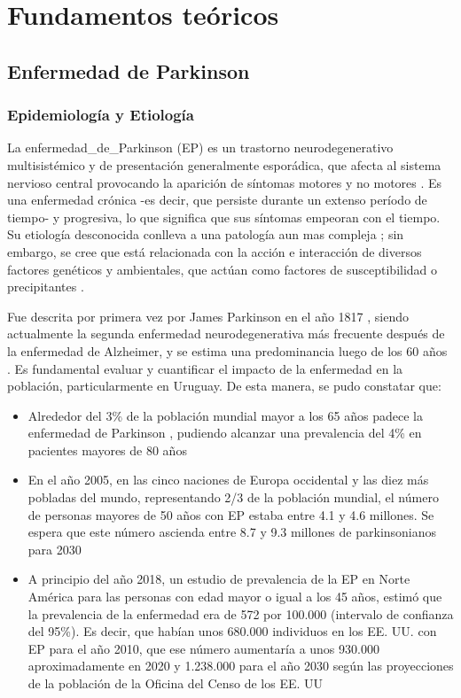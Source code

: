 \chapter{Fundamentos teóricos}\label{chap:fundamentos}

\section{Enfermedad de Parkinson}

\subsection{Epidemiología y Etiología}
La \gls{enfermedad_de_Parkinson} (EP) es un trastorno neurodegenerativo multisistémico y de presentación generalmente esporádica, que afecta al sistema nervioso central provocando la aparición de síntomas motores y no motores \cite{E2004}. Es una enfermedad crónica -es decir, que persiste durante un extenso período de tiempo- y progresiva, lo que significa que sus síntomas empeoran con el tiempo. Su etiología desconocida conlleva a una patología aun mas compleja \cite{3249850720080101}; sin embargo, se cree que está relacionada con la acción e interacción de diversos factores genéticos y ambientales, que actúan como factores de susceptibilidad o precipitantes \cite{CAMPDELACREU2014541}.

Fue descrita por primera vez por James Parkinson en el año 1817 \cite{JamesParkinson2002}, siendo actualmente la segunda enfermedad neurodegenerativa más frecuente después de la enfermedad de Alzheimer, y se estima una predominancia luego de los 60 años \cite{GOMEZGONZALEZ2019396,CHAVEZ-LEON2013}. Es fundamental evaluar y cuantificar el impacto de la enfermedad en la población, particularmente en Uruguay. De esta manera, se pudo constatar que:

\begin{itemize}
    \item Alrededor del 3\% de la población mundial mayor a los 65 años padece la enfermedad de Parkinson \cite{Patel2009}, pudiendo alcanzar una prevalencia del 4\% en pacientes mayores de 80 años \cite{DeLauBreteler}
    \item En el año 2005, en las cinco naciones de Europa occidental y las diez más pobladas del mundo, representando 2/3 de la población mundial, el número de personas mayores de 50 años con EP estaba entre 4.1 y 4.6 millones. Se espera que este número ascienda entre 8.7  y 9.3 millones de parkinsonianos para 2030 \cite{Dorsey2007ProjectedNO}
    \item A principio del año 2018, un estudio de prevalencia de la EP en Norte América para las personas con edad mayor o igual a los 45 años, estimó que la prevalencia de la enfermedad era de 572 por 100.000 (intervalo de confianza del 95\%). Es decir, que habían unos 680.000 individuos en los EE. UU. con EP para el año 2010, que ese número aumentaría a unos 930.000 aproximadamente en 2020 y 1.238.000 para el año 2030 según las proyecciones de la población de la Oficina del Censo de los EE. UU \cite{Marras2018}
\end{itemize}


